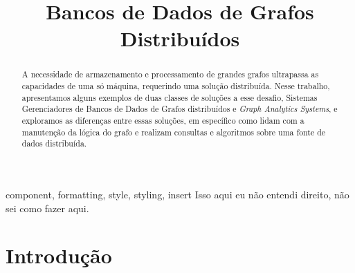 \documentclass[conference]{IEEEtran}
\begin{document}
\title{Bancos de Dados de Grafos Distribuídos\\
}

\author{
\and
{}
}

\maketitle

\begin{abstract}
    A necessidade de armazenamento e processamento de grandes grafos
    ultrapassa as capacidades de uma só máquina, requerindo uma solução
    distribuída. Nesse trabalho, apresentamos alguns exemplos de duas classes
    de soluções a esse desafio, Sistemas Gerenciadores de Bancos de Dados de
    Grafos distribuídos e \emph{Graph Analytics Systems}, e exploramos as
    diferenças entre essas soluções, em específico como lidam com a manutenção
    da lógica do grafo e realizam consultas e algoritmos sobre uma fonte de
    dados distribuída.
\end{abstract}

\begin{IEEEkeywords}
component, formatting, style, styling, insert
    {\color{red} Isso aqui eu não entendi direito, não sei como fazer aqui.}
\end{IEEEkeywords}

\section{Introdução}
%
\end{document}
